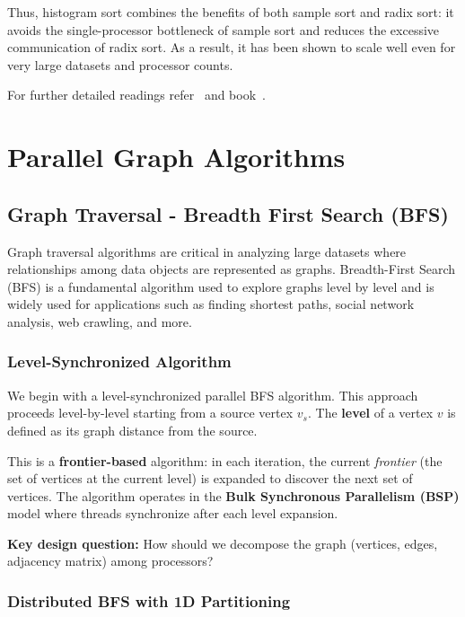 \documentclass[12pt]{book}
\begin{document}
Thus, histogram sort combines the benefits of both sample sort and radix sort: it avoids the single-processor bottleneck of sample sort and reduces the excessive communication of radix sort. As a result, it has been shown to scale well even for very large datasets and processor counts.

For further detailed readings refer~\cite{li1993versatility,shi1992parallel,solomonik2010highly} and book~\cite{kumar1994introduction}.

\section{Parallel Graph Algorithms}

\subsection{Graph Traversal - Breadth First Search (BFS)}
Graph traversal algorithms are critical in analyzing large datasets where relationships among data objects are represented as graphs. Breadth-First Search (BFS) is a fundamental algorithm used to explore graphs level by level and is widely used for applications such as finding shortest paths, social network analysis, web crawling, and more.

\subsubsection{Level-Synchronized Algorithm}

We begin with a level-synchronized parallel BFS algorithm. This approach proceeds level-by-level starting from a source vertex $v_s$. The \textbf{level} of a vertex $v$ is defined as its graph distance from the source.

This is a \textbf{frontier-based} algorithm: in each iteration, the current \textit{frontier} (the set of vertices at the current level) is expanded to discover the next set of vertices. The algorithm operates in the \textbf{Bulk Synchronous Parallelism (BSP)} model where threads synchronize after each level expansion.

\medskip
\noindent
\textbf{Key design question:} How should we decompose the graph (vertices, edges, adjacency matrix) among processors?

\subsubsection{Distributed BFS with 1D Partitioning}
\end{document}
